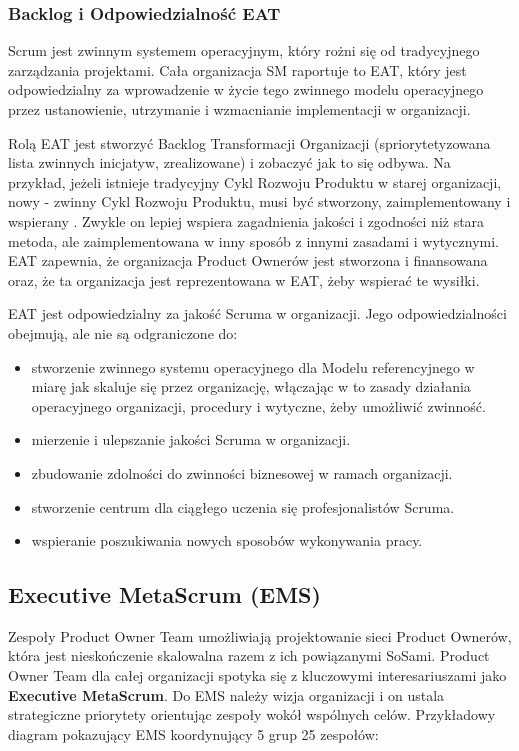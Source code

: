 \documentclass[12pt,a4paper,parskip=full]{scrartcl}
\begin{document}
\subsubsection{Backlog i Odpowiedzialność EAT}

Scrum jest zwinnym systemem operacyjnym, który rożni się od tradycyjnego zarządzania projektami. Cała organizacja SM raportuje to EAT, który jest odpowiedzialny za wprowadzenie w życie tego zwinnego modelu operacyjnego przez ustanowienie, utrzymanie i wzmacnianie implementacji w organizacji.

Rolą EAT jest stworzyć Backlog Transformacji Organizacji (spriorytetyzowana lista zwinnych inicjatyw, zrealizowane) i zobaczyć jak to się odbywa. Na przykład, jeżeli istnieje tradycyjny Cykl Rozwoju Produktu w starej organizacji, nowy - zwinny Cykl Rozwoju Produktu, musi być stworzony, zaimplementowany i wspierany . Zwykle on lepiej wspiera zagadnienia jakości i zgodności niż stara metoda, ale zaimplementowana w inny sposób z innymi zasadami i wytycznymi. EAT zapewnia, że organizacja Product Ownerów jest stworzona i finansowana oraz, że ta organizacja jest reprezentowana w EAT, żeby wspierać te wysiłki.

EAT jest odpowiedzialny za jakość Scruma w organizacji. Jego odpowiedzialności obejmują, ale nie są odgraniczone do:

\begin{itemize}
	\item stworzenie zwinnego systemu operacyjnego dla Modelu referencyjnego w miarę jak skaluje się przez organizację, włączając w to zasady działania operacyjnego organizacji, procedury i wytyczne, żeby umożliwić zwinność.
	\item mierzenie i ulepszanie jakości Scruma w organizacji.
	\item zbudowanie zdolności do zwinności biznesowej w ramach organizacji.
	\item stworzenie centrum dla ciągłego uczenia się profesjonalistów Scruma.
	\item wspieranie poszukiwania nowych sposobów wykonywania pracy.
\end{itemize}

\subsection{Executive MetaScrum (EMS)}

Zespoły Product Owner Team umożliwiają projektowanie sieci Product Ownerów, która jest nieskończenie skalowalna razem z ich powiązanymi SoSami. Product Owner Team dla całej organizacji spotyka się z kluczowymi interesariuszami jako \textbf{Executive MetaScrum}. Do EMS należy wizja organizacji i on ustala strategiczne priorytety orientując zespoły wokół wspólnych celów.
Przykładowy diagram pokazujący EMS koordynujący 5 grup 25 zespołów:
\end{document}
